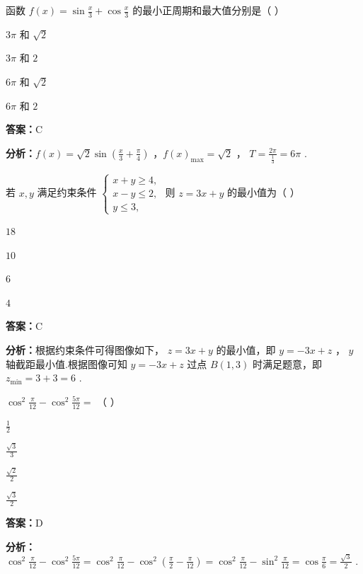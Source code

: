 \begin{question}[points=5]
函数 $f(x) = \sin\frac{x}{3} + \cos\frac{x}{3}$ 的最小正周期和最大值分别是（ ）
\begin{choices}
  \item $3\pi$ 和 $\sqrt{2}$
  \item $3\pi$ 和 $2$
  \item $6\pi$ 和 $\sqrt{2}$
  \item $6\pi$ 和 $2$
\end{choices}
\begin{solution}
\textbf{答案：}C

\textbf{分析：}$f(x) = \sqrt{2}\sin\left(\frac{x}{3} + \frac{\pi}{4}\right)$ ，$f(x)_{\max} = \sqrt{2}$ ， $T = \frac{2\pi}{\frac{1}{3}} = 6\pi$ .
\end{solution}
\end{question}

\begin{question}[points=5]
若 $x,y$ 满足约束条件 $\begin{cases} x + y \ge 4, \\ x - y \le 2, \\ y \le 3, \end{cases}$ 则 $z = 3x + y$ 的最小值为（ ）
\begin{choices}
  \item $18$
  \item $10$
  \item $6$
  \item $4$
\end{choices}
\begin{solution}
\textbf{答案：}C

\textbf{分析：}根据约束条件可得图像如下， $z = 3x + y$ 的最小值，即 $y = -3x + z$ ， $y$ 轴截距最小值.根据图像可知 $y = -3x + z$ 过点 $B(1,3)$ 时满足题意，即 $z_{\min} = 3 + 3 = 6$ .
\end{solution}
\end{question}

\begin{question}[points=5]
$\cos^2\frac{\pi}{12} - \cos^2\frac{5\pi}{12} =$ （ ）
\begin{choices}
  \item $\frac{1}{2}$
  \item $\frac{\sqrt{3}}{3}$
  \item $\frac{\sqrt{2}}{2}$
  \item $\frac{\sqrt{3}}{2}$
\end{choices}
\begin{solution}
\textbf{答案：}D

\textbf{分析：}$\cos^2\frac{\pi}{12} - \cos^2\frac{5\pi}{12} = \cos^2\frac{\pi}{12} - \cos^2\left(\frac{\pi}{2} - \frac{\pi}{12}\right) = \cos^2\frac{\pi}{12} - \sin^2\frac{\pi}{12} = \cos\frac{\pi}{6} = \frac{\sqrt{3}}{2}$ .
\end{solution}
\end{question}

